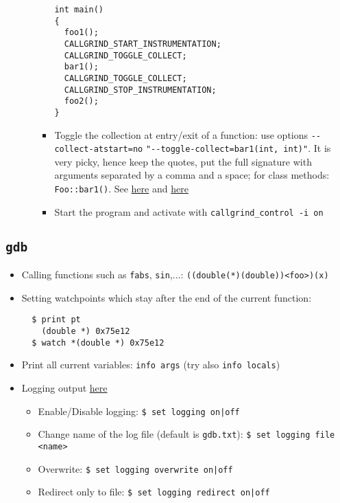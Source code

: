 \documentclass[a4paper,12pt,%
              final%
              ]{article}
\begin{document}
\begin{itemize}
\begin{itemize}
\begin{itemize}
\begin{verbatim}
int main()
{
  foo1();
  CALLGRIND_START_INSTRUMENTATION;
  CALLGRIND_TOGGLE_COLLECT;
  bar1();
  CALLGRIND_TOGGLE_COLLECT;
  CALLGRIND_STOP_INSTRUMENTATION;
  foo2();
}
\end{verbatim}
          \item Toggle the collection at entry/exit of a function: use options \verb|--collect-atstart=no| \verb|"--toggle-collect=bar1(int, int)"|. It is very picky, hence keep the quotes, put the full signature with arguments separated by a comma and a space; for class methods: \verb|Foo::bar1()|. See \href{https://valgrind-users.narkive.com/2YLNcvE8/callgrind-toggle-collect-on-a-class-function}{here} and \href{https://stackoverflow.com/questions/13688185/callgrind-profile-a-specific-part-of-my-code}{here}
          \item Start the program and activate with \verb|callgrind_control -i on|
        \end{itemize}
    \end{itemize}
\end{itemize}

\subsection{\texttt{gdb}}
\label{sec:gdb}
\begin{itemize}
  \item Calling functions such as \texttt{fabs}, \texttt{sin},...: \texttt{((double(*)(double))<foo>)(x)}
  \item Setting watchpoints which stay after the end of the current function:
\begin{verbatim}
  $ print pt
    (double *) 0x75e12
  $ watch *(double *) 0x75e12
\end{verbatim}
  \item Print all current variables: \texttt{info args} (try also \texttt{info locals})
  \item Logging output \href{https://sourceware.org/gdb/onlinedocs/gdb/Logging-Output.html}{here}
    \begin{itemize}
      \item Enable/Disable logging: \verb!$ set logging on|off!
      \item Change name of the log file (default is \texttt{gdb.txt}): \verb|$ set logging file <name>|
      \item Overwrite: \verb!$ set logging overwrite on|off!
      \item Redirect only to file: \verb!$ set logging redirect on|off!
    \end{itemize}
\end{itemize}
\end{document}
